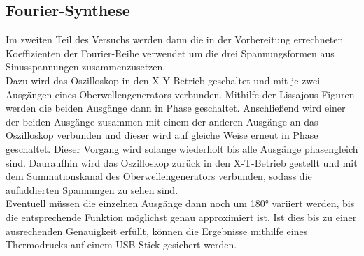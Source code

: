 \subsection{Fourier-Synthese}
Im zweiten Teil des Versuchs werden dann die in der Vorbereitung errechneten
Koeffizienten der Fourier-Reihe verwendet um die drei Spannungsformen aus
Sinusspannungen zusammenzusetzen. \\
Dazu wird das Oszilloskop in den X-Y-Betrieb geschaltet und mit je zwei
Ausgängen eines Oberwellengenerators verbunden. Mithilfe der Lissajous-Figuren
werden die beiden Ausgänge dann in Phase geschaltet. Anschließend wird einer der
beiden Ausgänge zusammen mit einem der anderen Ausgänge an das Oszilloskop
verbunden und dieser wird auf gleiche Weise erneut in Phase
geschaltet. Dieser Vorgang wird solange wiederholt bis alle Ausgänge phasengleich
sind. Dauraufhin wird das Oszilloskop zurück in den X-T-Betrieb gestellt und mit
dem Summationskanal des Oberwellengenerators verbunden, sodass die aufaddierten
Spannungen zu sehen sind. \\
Eventuell müssen die einzelnen Ausgänge dann noch um 180° variiert werden, bis
die entsprechende Funktion möglichst genau approximiert ist. Ist dies bis zu
einer ausrechenden Genauigkeit erfüllt, können die Ergebnisse mithilfe eines
Thermodrucks auf einem USB Stick gesichert werden.

